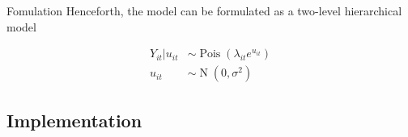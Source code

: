 \documentclass[aspectratio=169]{beamer}
\DeclareMathOperator{\N}{N}
\DeclareMathOperator{\Pois}{Pois}
\begin{document}
\begin{frame}{Fomulation}
\protect\hypertarget{fomulation}{}
Henceforth, the model can be formulated as a two-level hierarchical
model

\begin{subequations}
  \begin{alignat}{2}
    Y_{it}|u_{it} &\sim \Pois (\lambda_{it}e^{u_{it}}) \label{eq:pois_ln0} \\ 
    u_{it} &\sim \N(0,\sigma^2) \label{eq:pois_ln1}
  \end{alignat}
\end{subequations}
\end{frame}

\hypertarget{implementation}{%
\subsection{Implementation}\label{implementation}}
\end{document}
